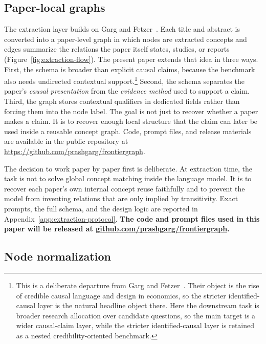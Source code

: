 \documentclass[11pt]{article}
\newcommand{\repoURL}{\href{https://github.com/prashgarg/frontiergraph}{github.com/prashgarg/frontiergraph}}
\begin{document}
\subsection{Paper-local graphs}

The extraction layer builds on Garg and Fetzer~\citeyearpar{gargfetzer2025causal}. Each title and abstract is converted into a paper-level graph in which nodes are extracted concepts and edges summarize the relations the paper itself states, studies, or reports (Figure~\ref{fig:extraction-flow}). The present paper extends that idea in three ways. First, the schema is broader than explicit causal claims, because the benchmark also needs undirected contextual support.\footnote{This is a deliberate departure from Garg and Fetzer~\citeyearpar{gargfetzer2025causal}. Their object is the rise of credible causal language and design in economics, so the stricter identified-causal layer is the natural headline object there. Here the downstream task is broader research allocation over candidate questions, so the main target is a wider causal-claim layer, while the stricter identified-causal layer is retained as a nested credibility-oriented benchmark.} Second, the schema separates the paper's \emph{causal presentation} from the \emph{evidence method} used to support a claim. Third, the graph stores contextual qualifiers in dedicated fields rather than forcing them into the node label. The goal is not just to recover whether a paper makes a claim. It is to recover enough local structure that the claim can later be used inside a reusable concept graph. Code, prompt files, and release materials are available in the public repository at \url{https://github.com/prashgarg/frontiergraph}.

The decision to work paper by paper first is deliberate. At extraction time, the task is not to solve global concept matching inside the language model. It is to recover each paper's own internal concept reuse faithfully and to prevent the model from inventing relations that are only implied by transitivity. Exact prompts, the full schema, and the design logic are reported in Appendix~\ref{app:extraction-protocol}. \textbf{The code and prompt files used in this paper will be released at \linebreak[2]\repoURL.}

\subsection{Node normalization}
\end{document}
